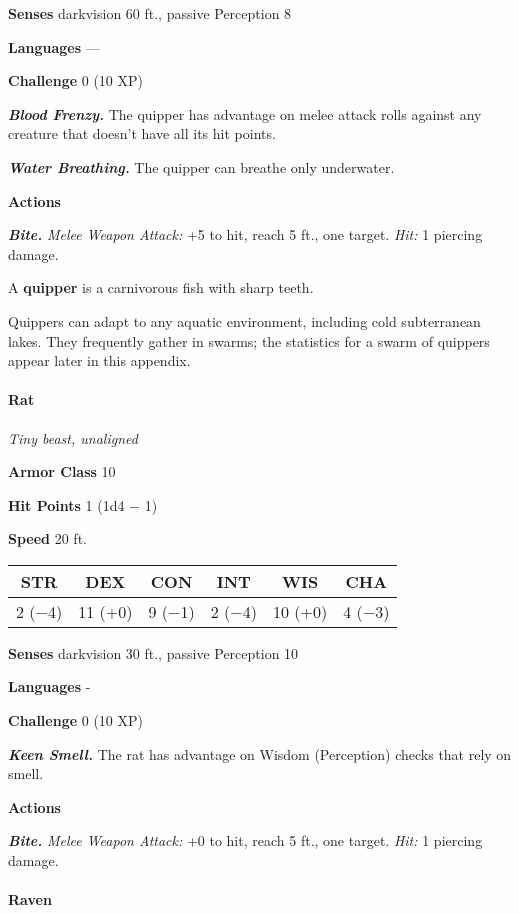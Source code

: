 \documentclass[
]{article}
\begin{document}
\textbf{Senses} darkvision 60 ft., passive Perception 8

\textbf{Languages} ---

\textbf{Challenge} 0 (10 XP)

\emph{\textbf{Blood Frenzy.}} The quipper has advantage on melee attack
rolls against any creature that doesn't have all its hit points.

\emph{\textbf{Water Breathing.}} The quipper can breathe only
underwater.

\textbf{Actions}

\emph{\textbf{Bite.}} \emph{Melee Weapon Attack:} +5 to hit, reach 5
ft., one target. \emph{Hit:} 1 piercing damage.

A \textbf{quipper} is a carnivorous fish with sharp teeth.

Quippers can adapt to any aquatic environment, including cold
subterranean lakes. They frequently gather in swarms; the statistics for
a swarm of quippers appear later in this appendix.

\hypertarget{rat}{%
\paragraph{Rat}\label{rat}}

\emph{Tiny beast, unaligned}

\textbf{Armor Class} 10

\textbf{Hit Points} 1 (1d4 − 1)

\textbf{Speed} 20 ft.

\begin{longtable}[]{@{}cccccc@{}}
\toprule
STR & DEX & CON & INT & WIS & CHA\tabularnewline
\midrule
\endhead
2 (−4) & 11 (+0) & 9 (−1) & 2 (−4) & 10 (+0) & 4 (−3)\tabularnewline
\bottomrule
\end{longtable}

\textbf{Senses} darkvision 30 ft., passive Perception 10

\textbf{Languages} -

\textbf{Challenge} 0 (10 XP)

\emph{\textbf{Keen Smell.}} The rat has advantage on Wisdom (Perception)
checks that rely on smell.

\textbf{Actions}

\emph{\textbf{Bite.}} \emph{Melee Weapon Attack:} +0 to hit, reach 5
ft., one target. \emph{Hit:} 1 piercing damage.

\hypertarget{raven}{%
\paragraph{Raven}\label{raven}}
\end{document}
